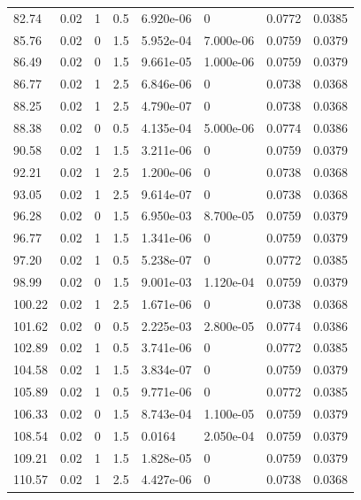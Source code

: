 \documentclass[preview]{standalone}
\begin{document}
{{{\begin{tabular}{L{1.2cm}C{1.2cm} C{0.3cm}C{0.5cm} C{1.4cm}C{1.4cm} C{1.4cm}C{1.4cm}}
  82.74  &  0.02  & 1     & 0.5 &  6.920e-06  & 0  & 0.0772 &  0.0385   \\ 
  85.76  &  0.02  & 0     & 1.5 &  5.952e-04  & 7.000e-06  & 0.0759 &  0.0379   \\ 
  86.49  &  0.02  & 0     & 1.5 &  9.661e-05  & 1.000e-06  & 0.0759 &  0.0379   \\ 
  86.77  &  0.02  & 1     & 2.5 &  6.846e-06  & 0  & 0.0738 &  0.0368   \\ 
  88.25  &  0.02  & 1     & 2.5 &  4.790e-07  & 0  & 0.0738 &  0.0368   \\ 
  88.38  &  0.02  & 0     & 0.5 &  4.135e-04  & 5.000e-06  & 0.0774 &  0.0386   \\ 
  90.58  &  0.02  & 1     & 1.5 &  3.211e-06  & 0  & 0.0759 &  0.0379   \\ 
  92.21  &  0.02  & 1     & 2.5 &  1.200e-06  & 0  & 0.0738 &  0.0368   \\ 
  93.05  &  0.02  & 1     & 2.5 &  9.614e-07  & 0  & 0.0738 &  0.0368   \\ 
  96.28  &  0.02  & 0     & 1.5 &  6.950e-03  & 8.700e-05  & 0.0759 &  0.0379   \\ 
  96.77  &  0.02  & 1     & 1.5 &  1.341e-06  & 0  & 0.0759 &  0.0379   \\ 
  97.20  &  0.02  & 1     & 0.5 &  5.238e-07  & 0  & 0.0772 &  0.0385   \\ 
  98.99  &  0.02  & 0     & 1.5 &  9.001e-03  & 1.120e-04  & 0.0759 &  0.0379   \\ 
  100.22  &  0.02  & 1     & 2.5 &  1.671e-06  & 0  & 0.0738 &  0.0368   \\ 
  101.62  &  0.02  & 0     & 0.5 &  2.225e-03  & 2.800e-05  & 0.0774 &  0.0386   \\ 
  102.89  &  0.02  & 1     & 0.5 &  3.741e-06  & 0  & 0.0772 &  0.0385   \\ 
  104.58  &  0.02  & 1     & 1.5 &  3.834e-07  & 0  & 0.0759 &  0.0379   \\ 
  105.89  &  0.02  & 1     & 0.5 &  9.771e-06  & 0  & 0.0772 &  0.0385   \\ 
  106.33  &  0.02  & 0     & 1.5 &  8.743e-04  & 1.100e-05  & 0.0759 &  0.0379   \\ 
  108.54  &  0.02  & 0     & 1.5 &  0.0164  & 2.050e-04  & 0.0759 &  0.0379   \\ 
  109.21  &  0.02  & 1     & 1.5 &  1.828e-05  & 0  & 0.0759 &  0.0379   \\ 
  110.57  &  0.02  & 1     & 2.5 &  4.427e-06  & 0  & 0.0738 &  0.0368   \\ 

\end{tabular}}}}
\end{document}
